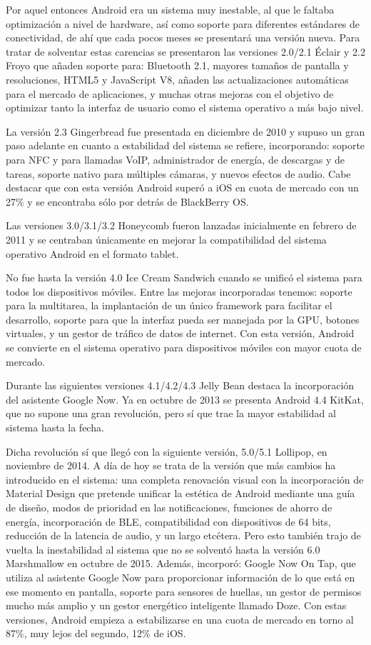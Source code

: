 Por aquel entonces Android era un sistema muy inestable, al que le faltaba optimización a nivel de hardware, así como soporte para diferentes estándares de conectividad, de ahí que cada pocos meses se presentará una versión nueva. Para tratar de solventar estas carencias se presentaron las versiones 2.0/2.1 Éclair y 2.2 Froyo que añaden soporte para: Bluetooth 2.1, mayores tamaños de pantalla y resoluciones, HTML5 y JavaScript V8, añaden las actualizaciones automáticas para el mercado de aplicaciones, y muchas otras mejoras con el objetivo de optimizar tanto la interfaz de usuario como el sistema operativo a más bajo nivel.

La versión 2.3 Gingerbread fue presentada en diciembre de 2010 y supuso un gran paso adelante en cuanto a estabilidad del sistema se refiere, incorporando: soporte para \gls{NFC} y para llamadas \gls{VoIP}, administrador de energía, de descargas y de tareas, soporte nativo para múltiples cámaras, y nuevos efectos de audio. Cabe destacar que con esta versión Android superó a iOS en cuota de mercado con un 27\% y se encontraba sólo por detrás de BlackBerry OS.

Las versiones 3.0/3.1/3.2 Honeycomb fueron lanzadas inicialmente en febrero de 2011 y se centraban únicamente en mejorar la compatibilidad del sistema operativo Android en el formato tablet.

No fue hasta la versión 4.0 Ice Cream Sandwich cuando se unificó el sistema para todos los dispositivos móviles. Entre las mejoras incorporadas tenemos: soporte para la multitarea, la implantación de un único framework para facilitar el desarrollo, soporte para que la interfaz pueda ser manejada por la \gls{GPU}, botones virtuales, y un gestor de tráfico de datos de internet. Con esta versión, Android se convierte en el sistema operativo para dispositivos móviles con mayor cuota de mercado.

Durante las siguientes versiones 4.1/4.2/4.3 Jelly Bean destaca la incorporación del asistente Google Now. Ya en octubre de 2013 se presenta Android 4.4 KitKat, que no supone una gran revolución, pero sí que trae la mayor estabilidad al sistema hasta la fecha.

Dicha revolución sí que llegó con la siguiente versión, 5.0/5.1 Lollipop, en noviembre de 2014. A día de hoy se trata de la versión que más cambios ha introducido en el sistema: una completa renovación visual con la incorporación de Material Design que pretende unificar la estética de Android mediante una guía de diseño, modos de prioridad en las notificaciones, funciones de ahorro de energía, incorporación de \gls{BLE}, compatibilidad con dispositivos de 64 bits, reducción de la latencia de audio, y un largo etcétera. Pero esto también trajo de vuelta la inestabilidad al sistema que no se solventó hasta la versión 6.0 Marshmallow en octubre de 2015. Además, incorporó: Google Now On Tap, que utiliza al asistente Google Now para proporcionar información de lo que está en ese momento en pantalla, soporte para sensores de huellas, un gestor de permisos mucho más amplio y un gestor energético inteligente llamado Doze. Con estas versiones, Android empieza a estabilizarse en una cuota de mercado en torno al 87\%, muy lejos del segundo, 12\% de iOS.

